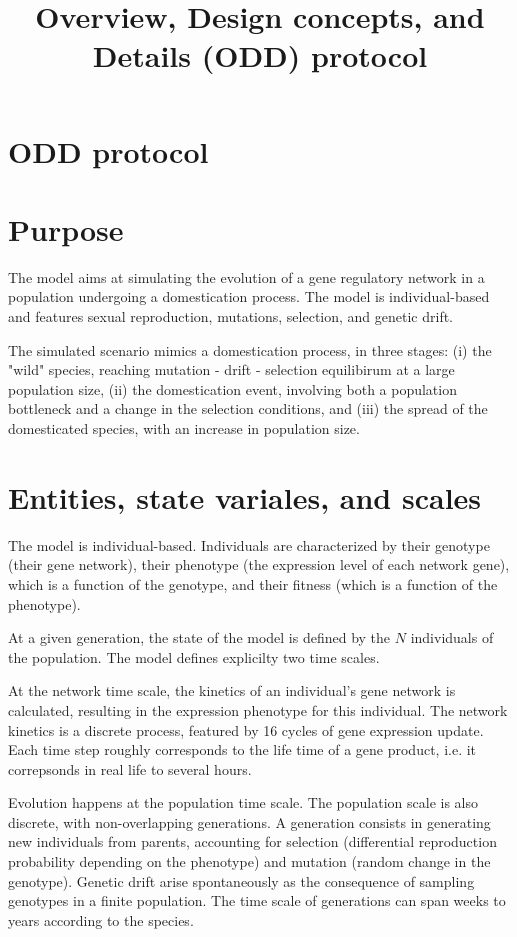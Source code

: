 \documentclass{article}
\title{Overview, Design concepts, and Details (ODD) protocol}
\begin{document}
\maketitle

\section*{ODD protocol}

\section{Purpose}

The model aims at simulating the evolution of a gene regulatory network in a population undergoing a domestication process. The model is individual-based and features sexual reproduction, mutations, selection, and genetic drift. 

The simulated scenario mimics a domestication process, in three stages: (i) the "wild" species, reaching mutation - drift - selection equilibirum at a large population size, (ii) the domestication event, involving both a population bottleneck and a change in the selection conditions, and (iii) the spread of the domesticated species, with an increase in population size.

\section{Entities, state variales, and scales}

The model is individual-based. Individuals are characterized by their genotype (their gene network), their phenotype (the expression level of each network gene), which is a function of the genotype, and their fitness (which is a function of the phenotype). 

At a given generation, the state of the model is defined by the $N$ individuals of the population. The model defines explicilty two time scales. 

At the network time scale, the kinetics of an individual's gene network is calculated, resulting in the expression phenotype for this individual. The network kinetics is a discrete process, featured by 16 cycles of gene expression update. Each time step roughly corresponds to the life time of a gene product, i.e. it correpsonds in real life to several hours.

Evolution happens at the population time scale. The population scale is also discrete, with non-overlapping generations. A generation consists in generating new individuals from parents, accounting for selection (differential reproduction probability depending on the phenotype) and mutation (random change in the genotype). Genetic drift arise spontaneously as the consequence of sampling genotypes in a finite population. The time scale of generations can span weeks to years according to the species. 
\end{document}
